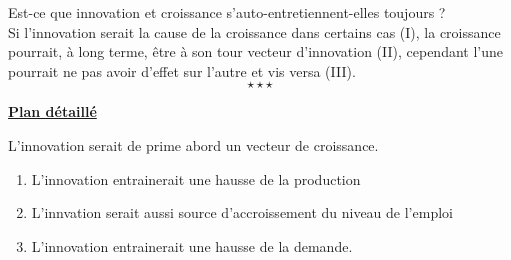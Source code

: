 Est-ce que innovation et croissance s'auto-entretiennent-elles toujours  ?\\

Si l'innovation serait la cause de la croissance dans certains cas (I), la croissance pourrait, à long terme, être à son tour vecteur d'innovation (II), cependant l'une pourrait ne pas avoir d'effet sur l'autre et vis versa (III). 
$$\star \star \star$$

\begin{center}
	{\bfseries \underline{Plan détaillé}}	
\end{center}
\begin{enumerate}[label=\Alph*.]
	{\bfseries \item L'innovation serait de prime abord un vecteur de croissance.}
	\begin{enumerate}[label=\theenumi\arabic* -]
		\item {L'innovation entrainerait une hausse de la production}%
		\item {L'innvation serait aussi source d'accroissement du niveau de l'emploi}%
		\item {L'innovation entrainerait une hausse de la demande.}%

\end{enumerate}
\end{enumerate}
